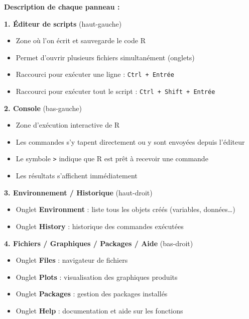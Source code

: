 \documentclass[
  french,
  11pt,
  a4paper,
]{article}
\providecommand{\tightlist}{%
  \setlength{\itemsep}{0pt}\setlength{\parskip}{0pt}}
\begin{document}
\textbf{Description de chaque panneau :}

\textbf{1. Éditeur de scripts} (haut-gauche)

\begin{itemize}
\tightlist
\item
  Zone où l'on écrit et sauvegarde le code R
\item
  Permet d'ouvrir plusieurs fichiers simultanément (onglets)
\item
  Raccourci pour exécuter une ligne : \texttt{Ctrl\ +\ Entrée}
\item
  Raccourci pour exécuter tout le script :
  \texttt{Ctrl\ +\ Shift\ +\ Entrée}
\end{itemize}

\textbf{2. Console} (bas-gauche)

\begin{itemize}
\tightlist
\item
  Zone d'exécution interactive de R
\item
  Les commandes s'y tapent directement ou y sont envoyées depuis
  l'éditeur
\item
  Le symbole \texttt{\textgreater{}} indique que R est prêt à recevoir
  une commande
\item
  Les résultats s'affichent immédiatement
\end{itemize}

\textbf{3. Environnement / Historique} (haut-droit)

\begin{itemize}
\tightlist
\item
  Onglet \textbf{Environment} : liste tous les objets créés (variables,
  données\ldots)
\item
  Onglet \textbf{History} : historique des commandes exécutées
\end{itemize}

\textbf{4. Fichiers / Graphiques / Packages / Aide} (bas-droit)

\begin{itemize}
\tightlist
\item
  Onglet \textbf{Files} : navigateur de fichiers
\item
  Onglet \textbf{Plots} : visualisation des graphiques produits
\item
  Onglet \textbf{Packages} : gestion des packages installés
\item
  Onglet \textbf{Help} : documentation et aide sur les fonctions
\end{itemize}
\end{document}
